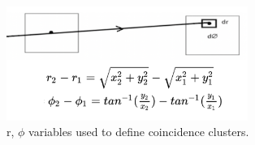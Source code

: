 \begin{figure}[!htp]
\centering
\includegraphics[width=0.7\textwidth]{ashish_thesis/dr_dphi_variables1_1.png}
\caption[New Variables For Two Fold Coincidences]{%
  r, $\phi$ variables used to define coincidence clusters. %
}
\label{fig:drdphi_diagram}
\end{figure}

